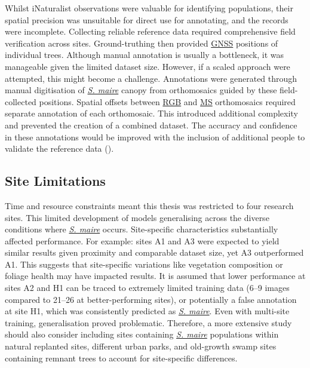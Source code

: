 \documentclass[
]{scrreprt}
\begin{document}
Whilst iNaturalist observations were valuable for identifying
populations, their spatial precision was unsuitable for direct use for
annotating, and the records were incomplete. Collecting reliable
reference data required comprehensive field verification across sites.
Ground-truthing then provided \hyperref[acronyms_GNSS]{GNSS} positions
of individual trees. Although manual annotation is usually a bottleneck,
it was manageable given the limited dataset size. However, if a scaled
approach were attempted, this might become a challenge. Annotations were
generated through manual digitisation of \hyperref[acronyms_SM]{\emph{S.
maire}} canopy from orthomosaics guided by these field-collected
positions. Spatial offsets between \hyperref[acronyms_RGB]{RGB} and
\hyperref[acronyms_MS]{MS} orthomosaics required separate annotation of
each orthomosaic. This introduced additional complexity and prevented
the creation of a combined dataset. The accuracy and confidence in these
annotations would be improved with the inclusion of additional people to
validate the reference data
().

\subsection{Site Limitations}\label{site-limitations}

Time and resource constraints meant this thesis was restricted to four
research sites. This limited development of models generalising across
the diverse conditions where \hyperref[acronyms_SM]{\emph{S. maire}}
occurs. Site-specific characteristics substantially affected
performance. For example: sites A1 and A3 were expected to yield similar
results given proximity and comparable dataset size, yet A3 outperformed
A1. This suggests that site-specific variations like vegetation
composition or foliage health may have impacted results. It is assumed
that lower performance at sites A2 and H1 can be traced to extremely
limited training data (6--9 images compared to 21--26 at
better-performing sites), or potentially a false annotation at site H1,
which was consistently predicted as \hyperref[acronyms_SM]{\emph{S.
maire}}. Even with multi-site training, generalisation proved
problematic. Therefore, a more extensive study should also consider
including sites containing \hyperref[acronyms_SM]{\emph{S. maire}}
populations within natural replanted sites, different urban parks, and
old-growth swamp sites containing remnant trees to account for
site-specific differences.
\end{document}
